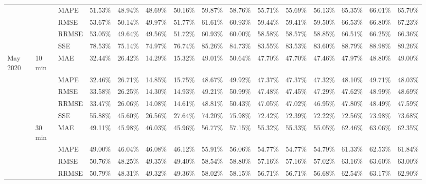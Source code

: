 {\begin{longtable}{lllcccccccccccc}
{} & {} & {MAPE} & {51.53\%} & {48.94\%} & {48.69\%} & {50.16\%} & {59.87\%} & {58.76\%} & {55.71\%} & {55.69\%} & {56.13\%} & {65.35\%} & {66.01\%} & {65.70\%} \\
{} & {} & {RMSE} & {53.67\%} & {50.14\%} & {49.97\%} & {51.77\%} & {61.61\%} & {60.93\%} & {59.44\%} & {59.41\%} & {59.50\%} & {66.53\%} & {66.80\%} & {67.23\%} \\
{} & {} & {RRMSE} & {53.05\%} & {49.64\%} & {49.56\%} & {51.72\%} & {60.93\%} & {60.00\%} & {58.58\%} & {58.57\%} & {58.85\%} & {66.51\%} & {66.25\%} & {66.36\%} \\
&  & {SSE} & {78.53\%} & {75.14\%} & {74.97\%} & {76.74\%} & {85.26\%} & {84.73\%} & {83.55\%} & {83.53\%} & {83.60\%} & {88.79\%} & {88.98\%} & {89.26\%} \\ \hline
{May 2020} & {10 min} & {MAE} & {32.44\%} & {26.42\%} & {14.29\%} & {15.32\%} & {49.01\%} & {50.64\%} & {47.70\%} & {47.70\%} & {47.46\%} & {47.97\%} & {48.80\%} & {49.00\%} \\
{} & {} & {MAPE} & {32.46\%} & {26.71\%} & {14.85\%} & {15.75\%} & {48.67\%} & {49.92\%} & {47.37\%} & {47.37\%} & {47.32\%} & {48.10\%} & {49.71\%} & {48.03\%} \\
{} & {} & {RMSE} & {33.58\%} & {26.25\%} & {14.30\%} & {14.93\%} & {49.21\%} & {50.99\%} & {47.48\%} & {47.45\%} & {47.29\%} & {47.62\%} & {48.99\%} & {48.69\%} \\
{} & {} & {RRMSE} & {33.47\%} & {26.06\%} & {14.08\%} & {14.61\%} & {48.81\%} & {50.43\%} & {47.05\%} & {47.02\%} & {46.95\%} & {47.80\%} & {48.49\%} & {47.59\%} \\
{} &  & {SSE} & {55.88\%} & {45.60\%} & {26.56\%} & {27.64\%} & {74.20\%} & {75.98\%} & {72.42\%} & {72.39\%} & {72.22\%} & {72.56\%} & {73.98\%} & {73.68\%} \\
{} & {30 min} & {MAE} & {49.11\%} & {45.98\%} & {46.03\%} & {45.96\%} & {56.77\%} & {57.15\%} & {55.32\%} & {55.33\%} & {55.05\%} & {62.46\%} & {63.06\%} & {62.35\%} \\
{} & {} & {MAPE} & {49.00\%} & {46.04\%} & {46.08\%} & {46.12\%} & {55.91\%} & {56.06\%} & {54.77\%} & {54.77\%} & {54.79\%} & {61.33\%} & {62.53\%} & {61.84\%} \\
{} & {} & {RMSE} & {50.76\%} & {48.25\%} & {49.35\%} & {49.40\%} & {58.54\%} & {58.80\%} & {57.16\%} & {57.16\%} & {57.02\%} & {63.16\%} & {63.60\%} & {63.00\%} \\
{} & {} & {RRMSE} & {50.79\%} & {48.31\%} & {49.32\%} & {49.36\%} & {58.02\%} & {58.15\%} & {56.71\%} & {56.71\%} & {56.68\%} & {62.54\%} & {63.17\%} & {62.90\%} \\

\end{longtable}}
